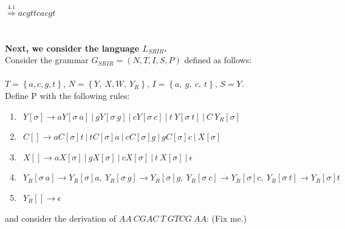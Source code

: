 \documentclass[11pt]{article}
\begin{document}
\indent\indent$            \overset{4.1}{\Rightarrow} acgttcacgt$ \\ \\ \\
{\bf Next, we consider the language $L_{SRIR}$.} \\
Consider the grammar $G_{SRIR} = (N, T, I, S, P)$ defined as follows:\\ \\
$T = \left\{a,c,g,t\right\}$, $N = \left\{Y, \ X, W, \ Y_R\right\}$, $I = \left\{a, \ g, \ c, \ t\right\}$,
$S = Y$. \\
Define P with the following rules:
\begin{enumerate}
\item $\ \ Y[\sigma] \rightarrow a Y[\sigma \ a] \ | \ g Y[\sigma \ g] \ | \ c Y[\sigma \ c] \ | \ t \ Y[\sigma \ t] \ | \ C \ Y_R[\sigma]$
\item $\ \ C[] \rightarrow a C[\sigma] t \ | \ t C[\sigma] a \ | \ c C[\sigma] g \ | \ g C[\sigma] c \ | \ X[\sigma]$
\item $\ \ X[] \rightarrow a X[\sigma] \ | \ g X[\sigma] \ | \ c X[\sigma] \ | \ t \ X[\sigma] \ | \ \epsilon$
\item $\ \ Y_R[\sigma \ a] \rightarrow Y_R[\sigma] a, \ Y_R[\sigma \ g] \rightarrow Y_R[\sigma] g, \ Y_R[\sigma \ c] \rightarrow Y_R[\sigma] c, \ Y_R[\sigma \ t] \rightarrow Y_R[\sigma] t$
\item $\ \ Y_R[] \rightarrow \epsilon$
\end{enumerate}
and consider the derivation of $AA \ CGAC \ T \ GTCG \ AA$:
(Fix me.)
\end{document}
